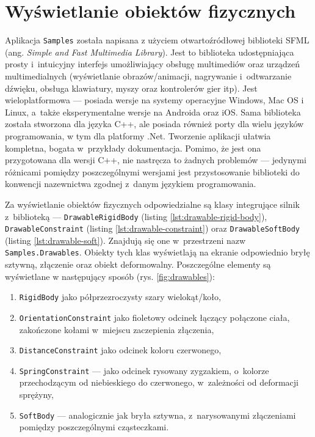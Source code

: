 \section{Wyświetlanie obiektów fizycznych}
\label{part:tech-sfml}
Aplikacja \verb|Samples| została napisana z użyciem otwartoźródłowej biblioteki SFML (ang. \textit{Simple and Fast Multimedia Library}). Jest to biblioteka udostępniająca prosty i~intuicyjny interfejs umożliwiający obsługę multimediów oraz urządzeń multimedialnych (wyświetlanie obrazów/animacji, nagrywanie i~odtwarzanie dźwięku, obsługa klawiatury, myszy oraz kontrolerów gier itp). Jest wieloplatformowa --- posiada wersje na systemy operacyjne Windows, Mac OS i Linux, a~także eksperymentalne wersje na Androida oraz iOS. Sama biblioteka została stworzona dla języka C++, ale posiada również porty dla wielu języków programowania, w tym dla platformy .Net. Tworzenie aplikacji ułatwia kompletna, bogata w~przykłady dokumentacja. Pomimo, że jest ona przygotowana dla wersji C++, nie nastręcza to żadnych problemów --- jedynymi różnicami pomiędzy poszczególnymi wersjami jest przystosowanie biblioteki do konwencji nazewnictwa zgodnej z~danym językiem programowania.

Za wyświetlanie obiektów fizycznych odpowiedzialne są klasy integrujące silnik z~biblioteką --- \verb|DrawableRigidBody| (listing \ref{lst:drawable-rigid-body}), \verb|DrawableConstraint| (listing \ref{lst:drawable-constraint}) oraz \verb|DrawableSoftBody| (listing \ref{lst:drawable-soft}). Znajdują się one w~przestrzeni nazw \verb|Samples.Drawables|. Obiekty tych klas wyświetlają na ekranie odpowiednio bryłę sztywną, złączenie oraz obiekt deformowalny. Poszczególne elementy są wyświetlane w następujący sposób (rys. \ref{fig:drawables}): 
\begin{enumerate}
	\item \verb|RigidBody| jako półprzezroczysty szary wielokąt/koło,
	\item \verb|OrientationConstraint| jako fioletowy odcinek łączący połączone ciała, zakończone kołami w~miejscu zaczepienia złączenia,
	\item \verb|DistanceConstraint| jako odcinek koloru czerwonego,
	\item \verb|SpringConstraint| --- jako odcinek rysowany zygzakiem, o~kolorze przechodzącym od niebieskiego do czerwonego, w~zależności od deformacji sprężyny,
	\item \verb|SoftBody| --- analogicznie jak bryła sztywna, z~narysowanymi złączeniami pomiędzy poszczególnymi cząsteczkami.	
\end{enumerate}

